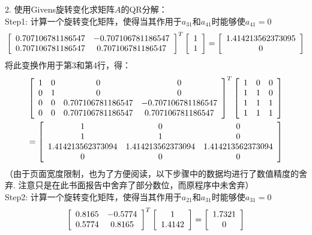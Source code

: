 \documentclass[UTF8]{ctexart}
\begin{document}
2. 使用Givens旋转变化求矩阵$A$的QR分解：\\
Step1: 计算一个旋转变化矩阵，使得当其作用于$a_{31}$和$a_{41}$时能够使$a_{41}=0$
\begin{align}
	\left[\begin{array}{cc}
	0.707106781186547 & -0.707106781186547 \\
	0.707106781186547 & 0.707106781186547 
	\end{array}\right]^{T}
	\left[\begin{array}{c}
	1 \\ 1
	\end{array}\right]
	=
	\left[\begin{array}{c}
	1.414213562373095 \\ 0
	\end{array}\right] \notag
\end{align}
将此变换作用于第3和第4行，得：
\begin{align}
	\left[\begin{array}{cccc}
	1 & 0 & 0 & 0 \\
	0 & 1 & 0 & 0 \\
	0 & 0 & 0.707106781186547 & -0.707106781186547 \\
	0 & 0 & 0.707106781186547 & 0.707106781186547 
	\end{array}\right]^{T}
	\left[\begin{array}{ccc}
	1 & 0 & 0 \\
	1 & 1 & 0 \\
	1 & 1 & 1 \\
	1 & 1 & 1
	\end{array}\right] \notag\\
	=
	\left[\begin{array}{ccc}
	1 & 0 & 0 \\
	1 & 1 & 0 \\
	1.414213562373094 & 1.414213562373094 & 1.414213562373094 \\
	0 & 0 & 0
	\end{array}\right] \notag
\end{align}
（由于页面宽度限制，也为了方便阅读，以下步骤中的数据均进行了数值精度的舍弃. 注意只是在此书面报告中舍弃了部分数位，而原程序中未舍弃）\\
Step2: 计算一个旋转变化矩阵，使得当其作用于$a_{21}$和$a_{31}$时能够使$a_{31}=0$
\begin{align}
	\left[\begin{array}{cc}
	0.8165 & -0.5774 \\
	0.5774 & 0.8165 
	\end{array}\right]^{T}
	\left[\begin{array}{c}
	1 \\
	1.4142
	\end{array}\right]
	=
	\left[\begin{array}{c}
	1.7321 \\ 0
	\end{array}\right] \notag
\end{align}
\end{document}
